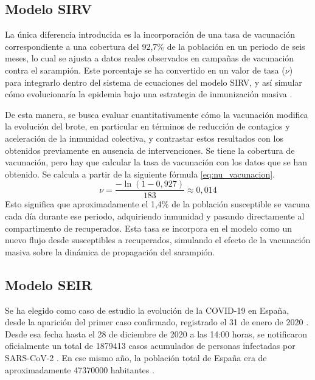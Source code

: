 \subsection{Modelo SIRV}
La única diferencia introducida es la incorporación de una tasa de vacunación correspondiente a una cobertura del 92,7\% de la población en un periodo de seis meses, lo cual se ajusta a datos reales observados en campañas de vacunación contra el sarampión. Este porcentaje se ha convertido en un valor de tasa ($\nu$) para integrarlo dentro del sistema de ecuaciones del modelo SIRV, y así simular cómo evolucionaría la epidemia bajo una estrategia de inmunización masiva \cite{cdc_measles_cases_2025}.

De esta manera, se busca evaluar cuantitativamente cómo la vacunación modifica la evolución del brote, en particular en términos de reducción de contagios y aceleración de la inmunidad colectiva, y contrastar estos resultados con los obtenidos previamente en ausencia de intervenciones.
Se tiene la cobertura de vacunación, pero hay que calcular la tasa de vacunación con los datos que se han obtenido. Se calcula a partir de la siguiente fórmula \eqref{eq:nu_vacunacion}. 
\begin{equation}
\nu = \frac{-\ln(1 - 0{,}927)}{183} \approx 0{,}014
\label{eq:nu_vacunacion}
\end{equation}
Esto significa que aproximadamente el 1,4\% de la población susceptible se vacuna cada día durante ese periodo, adquiriendo inmunidad y pasando directamente al compartimento de recuperados. Esta tasa se incorpora en el modelo como un nuevo flujo desde susceptibles a recuperados, simulando el efecto de la vacunación masiva sobre la dinámica de propagación del sarampión.






\subsection{Modelo SEIR}
Se ha elegido como caso de estudio la evolución de la COVID-19 en España, desde la aparición del primer caso confirmado, registrado el 31 de enero de 2020 \cite{primer_caso_covid_espana}. Desde esa fecha hasta el 28 de diciembre de 2020 a las 14:00 horas, se notificaron oficialmente un total de 1879413 casos acumulados de personas infectadas por SARS-CoV-2 \cite{sanidad_covid_situacion}. En ese mismo año, la población total de España era de aproximadamente 47370000 habitantes \cite{datacommons_espana_demografia}.

